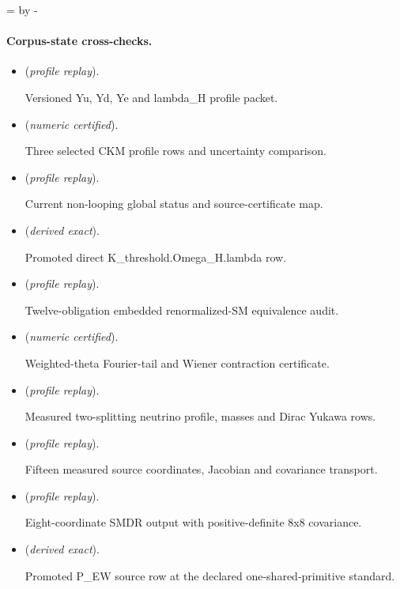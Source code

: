 \documentclass[11pt]{article}
\theoremstyle{plain}
\theoremstyle{definition}
\theoremstyle{remark}
\begin{document}
\par\begingroup{}=\pagegoal\advance{} by -\pagetotal\ifdim\dimen0<7\baselineskip\newpage\fi\endgroup
\paragraph{Corpus-state cross-checks.}
\begin{itemize}
\setlength{\itemsep}{0.25em}
\item {} (\emph{profile replay}).\par Versioned Yu, Yd, Ye and lambda\_H profile packet.
\item {} (\emph{numeric certified}).\par Three selected CKM profile rows and uncertainty comparison.
\item {} (\emph{profile replay}).\par Current non-looping global status and source-certificate map.
\item {} (\emph{derived exact}).\par Promoted direct K\_threshold.Omega\_H.lambda row.
\item {} (\emph{profile replay}).\par Twelve-obligation embedded renormalized-SM equivalence audit.
\item {} (\emph{numeric certified}).\par Weighted-theta Fourier-tail and Wiener contraction certificate.
\item {} (\emph{profile replay}).\par Measured two-splitting neutrino profile, masses and Dirac Yukawa rows.
\item {} (\emph{profile replay}).\par Fifteen measured source coordinates, Jacobian and covariance transport.
\item {} (\emph{profile replay}).\par Eight-coordinate SMDR output with positive-definite 8x8 covariance.
\item {} (\emph{derived exact}).\par Promoted P\_EW source row at the declared one-shared-primitive standard.
\end{itemize}
\end{document}
